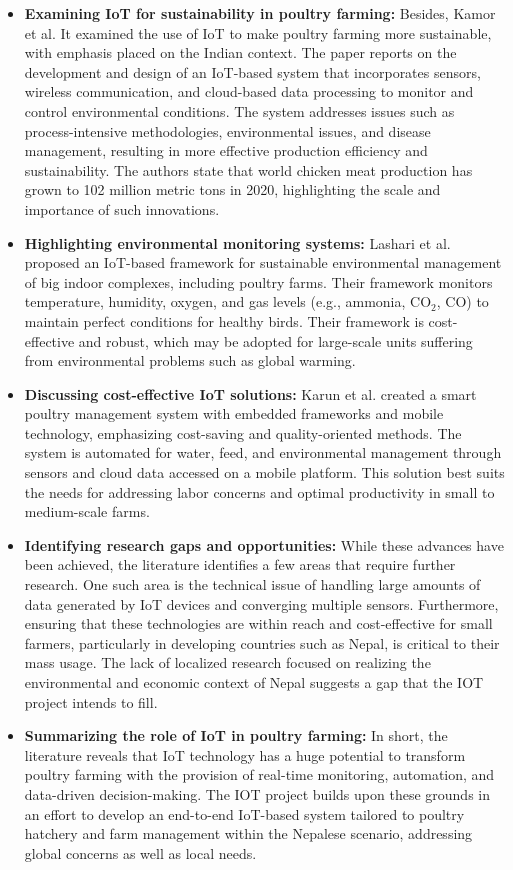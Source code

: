 \documentclass[../main.tex]{subfiles}
\begin{document}
\begin{itemize}
      \item {\textbf{Examining IoT for sustainability in poultry farming:}}
    Besides, Kamor et al. It examined the use of IoT to make poultry farming more sustainable, with emphasis placed on the Indian context. The paper reports on the development and design of an IoT-based system that incorporates sensors, wireless communication, and cloud-based data processing to monitor and control environmental conditions. The system addresses issues such as process-intensive methodologies, environmental issues, and disease management, resulting in more effective production efficiency and sustainability. The authors state that world chicken meat production has grown to 102 million metric tons in 2020, highlighting the scale and importance of such innovations.

\item {\textbf{Highlighting environmental monitoring systems:}}
Lashari et al. proposed an IoT-based framework for sustainable environmental management of big indoor complexes, including poultry farms. Their framework monitors temperature, humidity, oxygen, and gas levels (e.g., ammonia, CO$_2$, CO) to maintain perfect conditions for healthy birds. Their framework is cost-effective and robust, which may be adopted for large-scale units suffering from environmental problems such as global warming.


\item {\textbf{Discussing cost-effective IoT solutions:}}
Karun et al. created a smart poultry management system with embedded frameworks and mobile technology, emphasizing cost-saving and quality-oriented methods. The system is automated for water, feed, and environmental management through sensors and cloud data accessed on a mobile platform. This solution best suits the needs for addressing labor concerns and optimal productivity in small to medium-scale farms.


\item {\textbf{ Identifying research gaps and opportunities:}}
While these advances have been achieved, the literature identifies a few areas that require further research. One such area is the technical issue of handling large amounts of data generated by IoT devices and converging multiple sensors. Furthermore, ensuring that these technologies are within reach and cost-effective for small farmers, particularly in developing countries such as Nepal, is critical to their mass usage. The lack of localized research focused on realizing the environmental and economic context of Nepal suggests a gap that the IOT project intends to fill.

\item {\textbf{Summarizing the role of IoT in poultry farming:}}
In short, the literature reveals that IoT technology has a huge potential to transform poultry farming with the provision of real-time monitoring, automation, and data-driven decision-making. The IOT project builds upon these grounds in an effort to develop an end-to-end IoT-based system tailored to poultry hatchery and farm management within the Nepalese scenario, addressing global concerns as well as local needs.


    \end{itemize}
\end{document}
